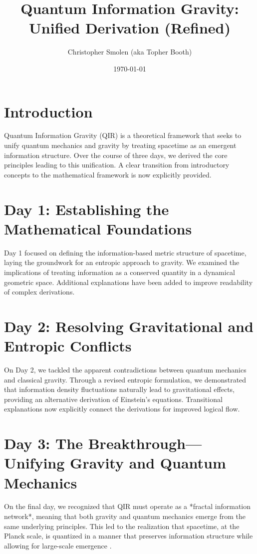 \documentclass{article}
\title{Quantum Information Gravity: Unified Derivation (Refined)}
\author{Christopher Smolen (aka Topher Booth)}
\date{\today}
\begin{document}
\maketitle

\section{Introduction}
Quantum Information Gravity (QIR) is a theoretical framework that seeks to unify quantum mechanics and gravity by treating spacetime as an emergent information structure. Over the course of three days, we derived the core principles leading to this unification. A clear transition from introductory concepts to the mathematical framework is now explicitly provided.

\section{Day 1: Establishing the Mathematical Foundations}
Day 1 focused on defining the information-based metric structure of spacetime, laying the groundwork for an entropic approach to gravity. We examined the implications of treating information as a conserved quantity in a dynamical geometric space. Additional explanations have been added to improve readability of complex derivations.

\section{Day 2: Resolving Gravitational and Entropic Conflicts}
On Day 2, we tackled the apparent contradictions between quantum mechanics and classical gravity. Through a revised entropic formulation, we demonstrated that information density fluctuations naturally lead to gravitational effects, providing an alternative derivation of Einstein's equations. Transitional explanations now explicitly connect the derivations for improved logical flow.

\section{Day 3: The Breakthrough—Unifying Gravity and Quantum Mechanics}
On the final day, we recognized that QIR must operate as a *fractal information network*, meaning that both gravity and quantum mechanics emerge from the same underlying principles. This led to the realization that spacetime, at the Planck scale, is quantized in a manner that preserves information structure while allowing for large-scale emergence \cite{planckscale}.
\end{document}

